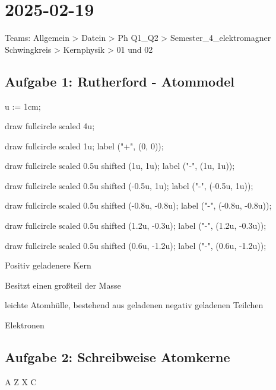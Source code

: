 \section{2025-02-19}

\startframedtask
Teams: Allgemein > Datein > Ph Q1_Q2 > Semester_4_elektromagner Schwingkreis > Kernphysik > 01 und 02
\stopframedtask

\subsection{Aufgabe 1: Rutherford - Atommodel}

\startMPpage

u := 1cm;

draw fullcircle scaled 4u;

draw fullcircle scaled 1u;
label ("+", (0, 0));


draw fullcircle scaled 0.5u shifted (1u, 1u);
label ("-", (1u, 1u));

draw fullcircle scaled 0.5u shifted (-0.5u, 1u);
label ("-", (-0.5u, 1u));

draw fullcircle scaled 0.5u shifted (-0.8u, -0.8u);
label ("-", (-0.8u, -0.8u));

draw fullcircle scaled 0.5u shifted (1.2u, -0.3u);
label ("-", (1.2u, -0.3u));

draw fullcircle scaled 0.5u shifted (0.6u, -1.2u);
label ("-", (0.6u, -1.2u));

\stopMPpage
\stopbuffer


\startitemize[packed]
\item Positiv geladenere Kern
\startitemize[packed]
\item Besitzt einen großteil der Masse
\stopitemize
\item leichte Atomhülle, bestehend aus geladenen negativ geladenen Teilchen
\startitemize[packed]
\item Elektronen
\stopitemize
\stopitemize

\subsection{Aufgabe 2: Schreibweise Atomkerne}

\startformula
\startmatrix
\NC A \NR \NC Z \NR
\stopmatrix
X \hat{=}
\startmatrix
\NC {} \hfill \NR
\NC {} \hfill \NR
\stopmatrix
{}
\startmatrix
{} \NR
{} \NR
\stopmatrix
C
\stopformula

